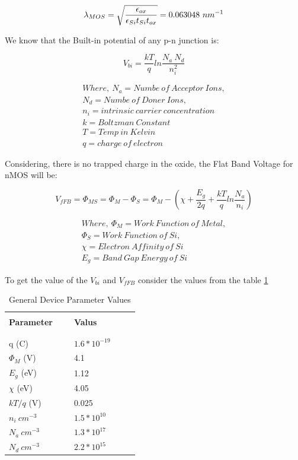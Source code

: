 \documentclass[a4paper]{article}
\begin{document}
\begin{equation}
  \lambda_{MOS} = \sqrt{{\frac{\epsilon_{ox}}{\epsilon_{Si}t_{Si}t_{ox}}}} =  0.063048~nm^{-1}
\end{equation}

We know that the Built-in potential of any p-n junction is:

\begin{equation}
  V_{bi} = \frac{kT}{q} ln\frac{N_{a}~N_{d}}{n_i^2}
\end{equation}

\begin{align*}
  Where,~N_a=Numbe~of~Acceptor~Ions,\\
  N_d=Numbe~of~Doner~Ions,\\
  n_i=intrinsic~carrier~concentration\\
  k=Boltzman~Constant\\
  T=Temp~in~Kelvin\\
  q=charge~of~electron
\end{align*}

Considering, there is no trapped charge in the oxide, the Flat Band Voltage for nMOS will be:

\begin{equation}
  V_{fFB} = \Phi_{MS} = \Phi_M - \Phi_S = \Phi_M - \left( \chi + \frac{E_g}{2q} + \frac{kT}{q}ln\frac{N_a}{n_i} \right)
\end{equation}

\begin{align*}
  Where,~\Phi_{M}=Work~Function~of~Metal,\\
  \Phi_{S}=Work~Function~of~Si,\\
  \chi=Electron~Affinity~of~Si\\
  E_g=Band~Gap~Energy~of~Si
\end{align*}

To get the value of the $V_{bi}$ and $V_{fFB}$ consider the values from the table \ref{tab:Gen-Device-values}

\begin{table}[!h]
  \caption{General Device Parameter Values}
  \label{tab:Gen-Device-values}
  \centering
  \begin{tabular}{p{0.4\linewidth} p{0.4\linewidth} }
    \hline
    \hline
    & \\
    \textbf{Parameter} & \textbf{Valus}\\
    & \\
    \hline
    & \\
    q (C) & $1.6 \ast 10^{-19}$ \\
    $\Phi_M$ (V) & 4.1\\
    $E_g$ (eV) & 1.12\\
    $\chi$ (eV) & 4.05\\
    $kT/q$ (V) & 0.025\\
    $n_i~cm^{-3}$ & $1.5 \ast 10^{10}$\\
    $N_a~cm^{-3}$ & $1.3 \ast 10^{17}$\\
    $N_d~cm^{-3}$ & $2.2 \ast 10^{15}$\\
    \hline
    \hline
  \end{tabular}
\end{table}
\end{document}
